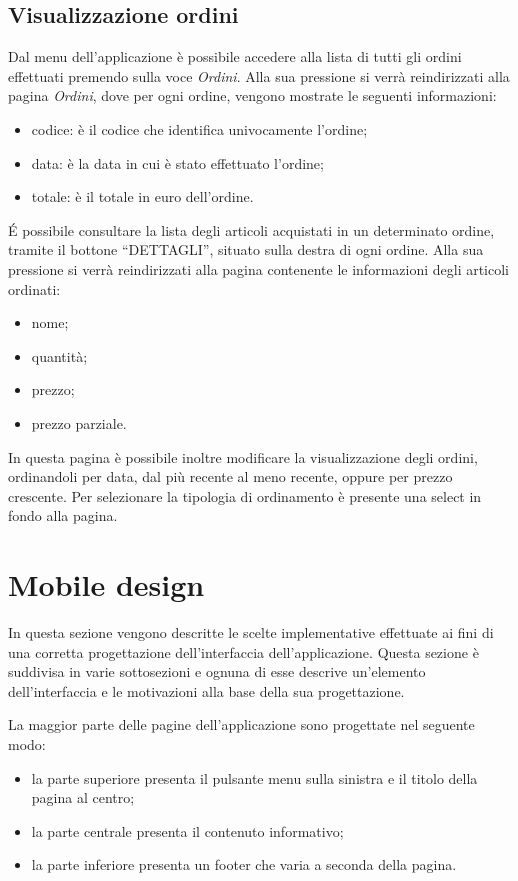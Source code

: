 \documentclass[12pt, a4paper, titlepage]{report}
\begin{document}
	\subsection{Visualizzazione ordini}
	Dal menu dell'applicazione è possibile accedere alla lista di tutti gli ordini effettuati premendo sulla voce \textit{Ordini}. Alla sua pressione si verrà reindirizzati alla pagina \textit{Ordini}, dove per ogni ordine, vengono mostrate le seguenti informazioni:
	\begin{itemize}
		\item codice: è il codice che identifica univocamente l'ordine;
		\item data: è la data in cui è stato effettuato l'ordine;
		\item totale: è il totale in euro dell'ordine.
	\end{itemize} 
	\'E possibile consultare la lista degli articoli acquistati in un determinato ordine, tramite il bottone ``DETTAGLI'', situato sulla destra di ogni ordine. Alla sua pressione si verrà reindirizzati alla pagina contenente le informazioni degli articoli ordinati:
	\begin{itemize}
		\item nome;
		\item quantità;
		\item prezzo;
		\item prezzo parziale.
	\end{itemize}
	\noindent In questa pagina è possibile inoltre modificare la visualizzazione degli ordini, ordinandoli per data, dal più recente al meno recente, oppure per prezzo crescente. Per selezionare la tipologia di ordinamento è presente una select in fondo alla pagina.
	
	\section{Mobile design}
	
	In questa sezione vengono descritte le scelte implementative effettuate ai fini di una corretta progettazione dell'interfaccia dell'applicazione. Questa sezione è suddivisa in varie sottosezioni e ognuna di esse descrive un'elemento dell'interfaccia e le motivazioni alla base della sua progettazione.
	\medskip
	
	\noindent La maggior parte delle pagine dell'applicazione sono progettate nel seguente modo:
	\begin{itemize}
		\item la parte superiore presenta il pulsante menu sulla sinistra e il titolo della pagina al centro;
		\item la parte centrale presenta il contenuto informativo;
		\item la parte inferiore presenta un footer che varia a seconda della pagina.
	\end{itemize}
	
\end{document}

